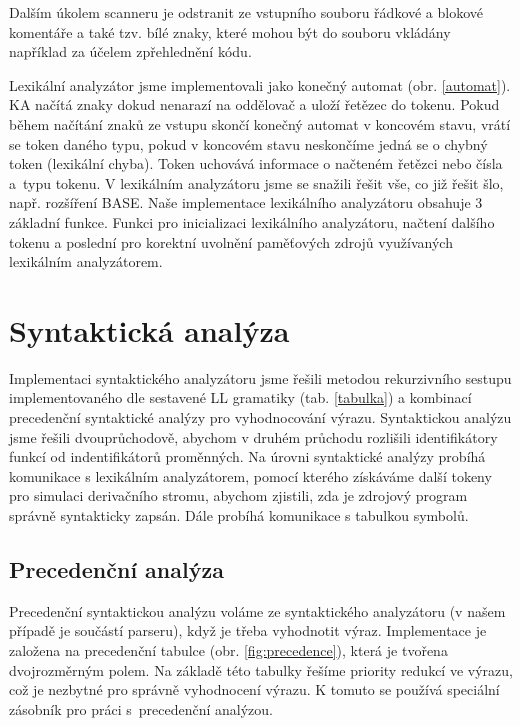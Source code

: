 \documentclass[12pt, a4paper]{article}
\begin{document}
Dalším úkolem scanneru je odstranit ze vstupního souboru řádkové a blokové komentáře a také tzv. bílé znaky, které mohou být do souboru vkládány například za účelem zpřehlednění kódu. \par

Lexikální analyzátor jsme implementovali jako konečný automat (obr. \ref{automat}). KA načítá znaky dokud nenarazí na oddělovač a uloží řetězec do tokenu. Pokud během načítání znaků ze vstupu skončí konečný automat v koncovém stavu, vrátí se token daného typu, pokud v koncovém stavu neskončíme jedná se o chybný token (lexikální chyba). Token uchovává informace o načteném řetězci nebo čísla a~typu tokenu. V lexikálním analyzátoru jsme se snažili řešit vše, co již řešit šlo, např. rozšíření BASE. Naše implementace lexikálního analyzátoru obsahuje 3 základní funkce. Funkci pro inicializaci lexikálního analyzátoru, načtení dalšího tokenu a poslední pro korektní uvolnění paměťových zdrojů využívaných lexikálním analyzátorem. \par

\section{Syntaktická analýza}
Implementaci syntaktického analyzátoru jsme řešili metodou rekurzivního sestupu implementovaného dle sestavené LL gramatiky (tab. \ref{tabulka}) a kombinací precedenční syntaktické analýzy pro vyhodnocování výrazu. Syntaktickou analýzu jsme řešili dvouprůchodově, abychom v druhém průchodu rozlišili identifikátory funkcí od indentifikátorů proměnných. Na úrovni syntaktické analýzy probíhá komunikace s lexikálním analyzátorem, pomocí kterého získáváme další tokeny pro simulaci derivačního stromu, abychom zjistili, zda je zdrojový program správně syntakticky zapsán. Dále probíhá komunikace s tabulkou symbolů. \par

\subsection{Precedenční analýza}
Precedenční syntaktickou analýzu voláme ze syntaktického analyzátoru (v našem případě je součástí parseru), když je třeba vyhodnotit výraz. Implementace je založena na precedenční tabulce (obr. \ref{fig:precedence}), která je tvořena dvojrozměrným polem. Na základě této tabulky řešíme priority redukcí ve výrazu, což je nezbytné pro správně vyhodnocení výrazu. K tomuto se používá speciální zásobník pro práci s~precedenční analýzou. \par 
\end{document}
